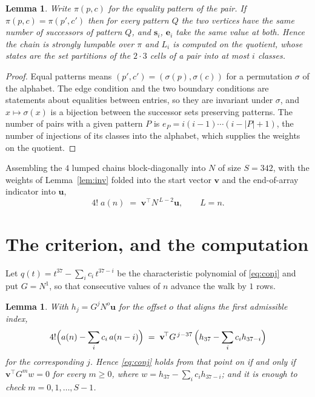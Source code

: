\documentclass[11pt,a4paper]{article}
\theoremstyle{plain}
\newtheorem{lemma}[theorem]{Lemma}
\theoremstyle{definition}
\begin{document}
\begin{lemma}\label{lem:lump}
Write $\pi(p,c)$ for the equality pattern of the pair. If $\pi(p,c)=\pi(p',c')$ then for
every pattern $Q$ the two vertices have the same number of successors of pattern $Q$, and
$\mathbf{s}_i$, $\mathbf{e}_i$ take the same value at both. Hence the chain is strongly
lumpable over $\pi$ and $L_i$ is computed on the quotient, whose states are the set
partitions of the $2\cdot3$ cells of a pair into at most $i$ classes.
\end{lemma}

\begin{proof}
Equal patterns means $(p',c')=(\sigma(p),\sigma(c))$ for a permutation $\sigma$ of the
alphabet. The edge condition and the two boundary conditions are statements about equalities
between entries, so they are invariant under $\sigma$, and $x\mapsto\sigma(x)$ is a bijection
between the successor sets preserving patterns. The number of pairs with a given pattern $P$
is $e_P=i(i-1)\cdots(i-|P|+1)$, the number of injections of its classes into the alphabet,
which supplies the weights on the quotient.
\end{proof}

Assembling the $4$ lumped chains block-diagonally into $N$ of size $S=342$, with the
weights of Lemma~\ref{lem:inv} folded into the start vector $\mathbf{v}$ and the
end-of-array indicator into $\mathbf{u}$,
\begin{equation}\label{eq:walk2}
4!\;a(n)\;=\;\mathbf{v}^{\!\top}N^{\,L-2}\mathbf{u},\qquad L=n .
\end{equation}

\section{The criterion, and the computation}

Let $q(t)=t^{37}-\sum_i c_i\,t^{37-i}$ be the characteristic polynomial of
\eqref{eq:conj} and put $G=N^{1}$, so that consecutive values of $n$ advance the
walk by $1$ rows.

\begin{lemma}\label{lem:crit}
With $h_j=G^{j}N^{o}\mathbf{u}$ for the offset $o$ that aligns the first admissible
index,
\[
4!\Bigl(a(n)-\sum_i c_i\,a(n-i)\Bigr)\;=\;\mathbf{v}^{\!\top}G^{\,j-37}\,
\Bigl(h_{37}-\sum_i c_i h_{37-i}\Bigr)
\]
for the corresponding $j$. Hence \eqref{eq:conj} holds from that point on if and only if
$\mathbf{v}^{\!\top}G^{m}w=0$ for every $m\ge0$, where
$w=h_{37}-\sum_i c_ih_{37-i}$; and it is enough to check $m=0,1,\dots,S-1$.
\end{lemma}
\end{document}
